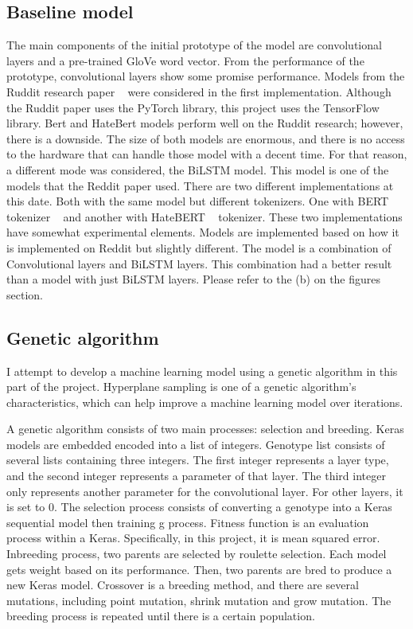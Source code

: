 \documentclass[11pt, natbib=false]{article}
\begin{document}
\subsection{Baseline model}
The main components of the initial prototype of the model are convolutional layers and a pre-trained GloVe word vector. From the performance of the prototype, convolutional layers show some promise performance.
Models from the Ruddit research paper ~\cite{hada2021ruddit} were considered in the first implementation. Although the Ruddit paper uses the PyTorch library, this project uses the TensorFlow library.
Bert and HateBert models perform well on the Ruddit research; however, there is a downside.
The size of both models are enormous, and there is no access to the hardware that can handle those model with a decent time. For that reason, a different mode was considered, the BiLSTM model.
This model is one of the models that the Reddit paper used. There are two different implementations at this date.
Both with the same model but different tokenizers.
One with BERT tokenizer ~\cite{devlin2018bert} and another with HateBERT ~\cite{caselli2020hatebert} tokenizer.
These two implementations have somewhat experimental elements.
Models are implemented based on how it is implemented on Reddit but slightly different.
The model is a combination of Convolutional layers and BiLSTM layers.
This combination had a better result than a model with just BiLSTM layers.
Please refer to the (b) on the figures section.

\subsection{Genetic algorithm}
I attempt to develop a machine learning model using a genetic algorithm in this part of the project.
Hyperplane sampling is one of a genetic algorithm's characteristics, which can help improve a machine learning model over iterations.

A genetic algorithm consists of two main processes: selection and breeding.
Keras models are embedded encoded into a list of integers.
Genotype list consists of several lists containing three integers.
The first integer represents a layer type, and the second integer represents a parameter of that layer.
The third integer only represents another parameter for the convolutional layer.
For other layers, it is set to 0.
The selection process consists of converting a genotype into a Keras sequential model then training g process.
Fitness function is an evaluation process within a Keras.
Specifically, in this project, it is mean squared error.
Inbreeding process, two parents are selected by roulette selection.
Each model gets weight based on its performance.
Then, two parents are bred to produce a new Keras model.
Crossover is a breeding method, and there are several mutations, including point mutation, shrink mutation and grow mutation.
The breeding process is repeated until there is a certain population.
\end{document}
